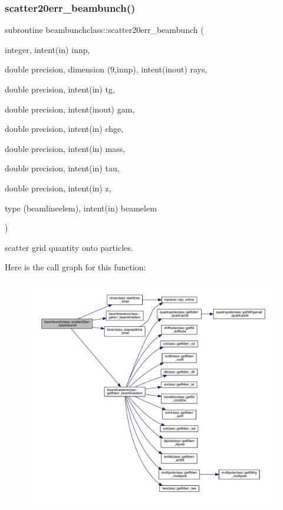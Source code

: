 \subsubsection{\texorpdfstring{scatter20err\_beambunch()}{scatter20err\_beambunch()}}
{\footnotesize\ttfamily subroutine beambunchclass\+::scatter20err\+\_\+beambunch (\begin{DoxyParamCaption}\item[{integer, intent(in)}]{innp,  }\item[{double precision, dimension (9,innp), intent(inout)}]{rays,  }\item[{double precision, intent(in)}]{tg,  }\item[{double precision, intent(inout)}]{gam,  }\item[{double precision, intent(in)}]{chge,  }\item[{double precision, intent(in)}]{mass,  }\item[{double precision, intent(in)}]{tau,  }\item[{double precision, intent(in)}]{z,  }\item[{type (beamlineelem), intent(in)}]{beamelem }\end{DoxyParamCaption})}



scatter grid quantity onto particles. 

Here is the call graph for this function\+:\nopagebreak
\begin{figure}[H]
\begin{center}
\leavevmode
\includegraphics[width=350pt]{namespacebeambunchclass_add3fe05fd157f9a0d3f09445660f038e_cgraph}
\end{center}
\end{figure}
\mbox{\label{namespacebeambunchclass_ad2054e6e5714a86db0112c5eb3978abb}} 
